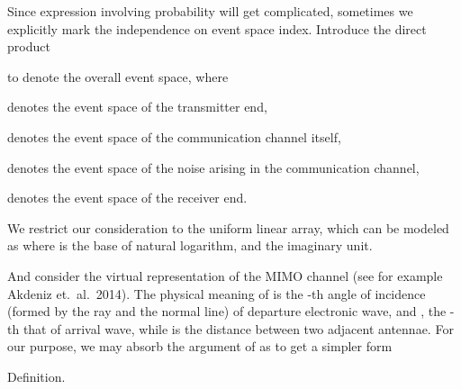 \startchapter [title={Problem Setting}]

\startsection [title={Channel Model}]

Since expression involving probability will get complicated, sometimes we explicitly mark the independence on event space index.
Introduce the direct product
%


%
to denote the overall event space, where


\startitemize
\item {} denotes the event space of the transmitter end,
\item {} denotes the event space of the communication channel itself,
\item {} denotes the event space of the noise arising in the communication channel,
\item {} denotes the event space of the receiver end.
\stopitemize
%

We restrict our consideration to the uniform linear array, which can be modeled as
%
%
where  is the base of natural logarithm, and  the imaginary unit.

And consider the virtual representation of the MIMO channel (see for example Akdeniz et.\ al.\ 2014).
%
%
The physical meaning of  is the -th angle of incidence (formed by the ray and the normal line) of departure electronic wave, and , the -th that of arrival wave, while  is the distance between two adjacent antennae.
For our purpose, we may absorb the argument of  as
%
%
to get a simpler form
%
%

\Result
{Definition.}
{
}

\stopsection



\startsection [title={System Model}]

